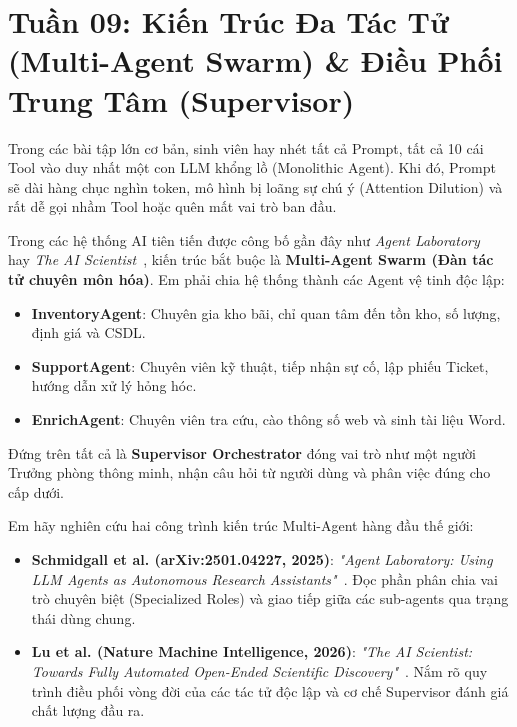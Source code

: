 ﻿\section{Tuần 09: Kiến Trúc Đa Tác Tử (Multi-Agent Swarm) \& Điều Phối Trung Tâm (Supervisor)}
\label{sec:tuan_09}

\begin{advisorbox}
Trong các bài tập lớn cơ bản, sinh viên hay nhét tất cả Prompt, tất cả 10 cái Tool vào duy nhất một con LLM khổng lồ (Monolithic Agent). Khi đó, Prompt sẽ dài hàng chục nghìn token, mô hình bị loãng sự chú ý (Attention Dilution) và rất dễ gọi nhầm Tool hoặc quên mất vai trò ban đầu.

Trong các hệ thống AI tiên tiến được công bố gần đây như \textit{Agent Laboratory}~\cite{schmidgall2025agentlab} hay \textit{The AI Scientist}~\cite{sakana2024aiscientist}, kiến trúc bắt buộc là \textbf{Multi-Agent Swarm (Đàn tác tử chuyên môn hóa)}. Em phải chia hệ thống thành các Agent vệ tinh độc lập:
\begin{itemize}[leftmargin=1.5em]
    \item \textbf{InventoryAgent}: Chuyên gia kho bãi, chỉ quan tâm đến tồn kho, số lượng, định giá và CSDL.
    \item \textbf{SupportAgent}: Chuyên viên kỹ thuật, tiếp nhận sự cố, lập phiếu Ticket, hướng dẫn xử lý hỏng hóc.
    \item \textbf{EnrichAgent}: Chuyên viên tra cứu, cào thông số web và sinh tài liệu Word.
\end{itemize}
Đứng trên tất cả là \textbf{Supervisor Orchestrator} đóng vai trò như một người Trưởng phòng thông minh, nhận câu hỏi từ người dùng và phân việc đúng cho cấp dưới.
\end{advisorbox}

\begin{literaturebox}
Em hãy nghiên cứu hai công trình kiến trúc Multi-Agent hàng đầu thế giới:
\begin{itemize}[leftmargin=1.5em]
    \item \textbf{Schmidgall et al. (arXiv:2501.04227, 2025)}: \textit{"Agent Laboratory: Using LLM Agents as Autonomous Research Assistants"}~\cite{schmidgall2025agentlab}. Đọc phần phân chia vai trò chuyên biệt (Specialized Roles) và giao tiếp giữa các sub-agents qua trạng thái dùng chung.
    \item \textbf{Lu et al. (Nature Machine Intelligence, 2026)}: \textit{"The AI Scientist: Towards Fully Automated Open-Ended Scientific Discovery"}~\cite{sakana2024aiscientist}. Nắm rõ quy trình điều phối vòng đời của các tác tử độc lập và cơ chế Supervisor đánh giá chất lượng đầu ra.
\end{itemize}
\end{literaturebox}

